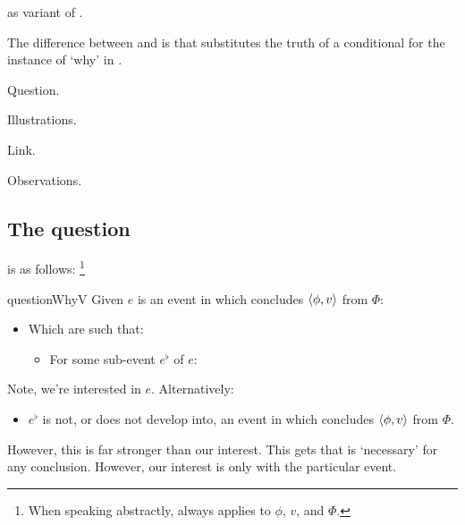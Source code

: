 \begin{note}
  \qWhyV{} as variant of \qWhy{}.

  The difference between \qWhyV{} and \qWhy{} is that \qWhyV{} substitutes the truth of a conditional for  the instance of `why' in \qWhy{}.

  Question.

  Illustrations.

  Link.

  Observations.
\end{note}

\subsection{The question}
\label{cha:var:qwhyvnp:question}

\begin{note}
  \qWhyV{} is as follows:%
  \footnote{
    When speaking abstractly, \qWhyV{} always applies to \(\phi\), \(v\), and \(\Phi\).
  }

  \begin{question}{questionWhyV}{\qWhyV{}}%
    Given \(e\) is an event in which \vAgent{} concludes \(\langle \phi, v \rangle\) from \(\Phi\):

    \begin{itemize}
    \item
      Which  are such that:
      \begin{itemize}
      \item
        For some sub-event \(e^{\flat}\) of \(e\):
      \end{itemize}
    \end{itemize}
    \vspace{-1.5\baselineskip}
  \end{question}

  {
    \color{red}
    Note, we're interested in \(e\).
    Alternatively:
    \begin{itemize}
    \item
      \(e^{\flat}\) is not, or does not develop into, an event in which \vAgent{} concludes \(\langle \phi, v \rangle\) from \(\Phi\).
    \end{itemize}
    However, this is far stronger than our interest.
    This gets that \ros{} is `necessary' for any conclusion.
    However, our interest is only with the particular event.
  }


\end{note}
